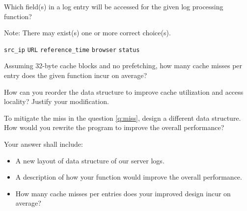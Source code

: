 \begin{questions}

\question[2] Which field(s) in a log entry will be accessed for the
given log processing function?

{
    \begin{solution}
        Note: There may exist(s) one or more correct choice(s).\\
        \begin{oneparcheckboxes}
            \choice \texttt{src\_ip}
            \choice \texttt{URL}
            \choice \texttt{reference\_time}
            \choice \texttt{browser}
            \choice \texttt{status}
        \end{oneparcheckboxes}
    \end{solution}
}

\question[1] Assuming 32-byte cache blocks and no prefetching, how
many cache misses per entry does the given function incur on average? \label{q:miss}

{
    \begin{solution}
        \fillin[][4in]
    \end{solution}
}

\question[3] How can you reorder the data structure to improve
cache utilization and access locality? Justify your modification.

{
    \begin{solution}
        \vspace{1in}
    \end{solution}
}

\newpage

\question[6] To mitigate the miss in the question \ref{q:miss},
design a different data structure. How would you rewrite the
program to improve the overall performance?

Your answer shall include:

\begin{itemize}
    \item A new layout of data structure of our server logs.
    \item A description of how your function would improve the
    overall performance.
    \item How many cache misses per entries does your improved
    design incur on average?
\end{itemize}

{
    \begin{solution}

        \vspace{4in}
    \end{solution}
}

\end{questions}